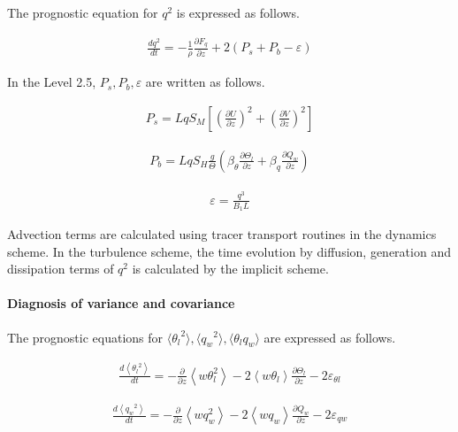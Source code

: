 The prognostic equation for \(q^2\) is expressed as follows.

\begin{eqnarray} \frac{d q^2}{dt}=-\frac{1}{\rho}\frac{\partial F_q}{\partial z}+2\left(P_s+P_b-\varepsilon\right) \end{eqnarray}

In the Level 2.5, \(P_s,P_b,\varepsilon\) are written as follows.

\begin{eqnarray}P_s=Lq S_M \left[\left(\frac{\partial U}{\partial z}\right)^2+\left(\frac{\partial V}{\partial z}\right)^2\right]\end{eqnarray}

\begin{eqnarray}P_b=Lq S_H \frac{g}{\Theta}\left(\beta_\theta \frac{\partial \Theta_l}{\partial z}+\beta_q \frac{\partial Q_w}{\partial z}\right)\end{eqnarray}

\begin{eqnarray}\varepsilon=\frac{q^3}{B_1L}\end{eqnarray}

Advection terms are calculated using tracer transport routines in the
dynamics scheme. In the turbulence scheme, the time evolution by
diffusion, generation and dissipation terms of \(q^2\) is calculated by
the implicit scheme.

\hypertarget{diagnosis-of-variance-and-covariance}{%
\paragraph{Diagnosis of variance and
covariance}\label{diagnosis-of-variance-and-covariance}}

The prognostic equations for
\(\langle {\theta_l}^2 \rangle,\langle {q_w}^2 \rangle,\langle \theta_l q_w \rangle\)
are expressed as follows.

\begin{eqnarray}
\frac{d\left\langle{\theta_l}^{2}\right\rangle}{d t}=-\frac{\partial}{\partial z}\left\langle w \theta_{l}^{2}\right\rangle-2\left\langle w \theta_{l}\right\rangle \frac{\partial \Theta_{l}}{\partial z}-2 \varepsilon_{\theta l}
\end{eqnarray}

\begin{eqnarray}
\frac{d\left\langle {q_w}^{2}\right\rangle}{d t}=-\frac{\partial}{\partial z}\left\langle w q_{w}^{2}\right\rangle-2\left\langle w q_{w}\right\rangle \frac{\partial Q_{w}}{\partial z}-2 \varepsilon_{q w}
\end{eqnarray}


